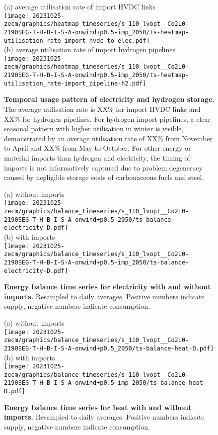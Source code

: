 \begin{figure*}
    \centering
    \footnotesize
    (a) average utilisation rate of import HVDC links \\
    \texttt{[image: 20231025-zecm/graphics/heatmap\_timeseries/s\_110\_lvopt\_\_Co2L0-2190SEG-T-H-B-I-S-A-onwind+p0.5-imp\_2050/ts-heatmap-utilisation\_rate-import\_hvdc-to-elec.pdf]} \\
    (b) average utilisation rate of import hydrogen pipelines \\
    \texttt{[image: 20231025-zecm/graphics/heatmap\_timeseries/s\_110\_lvopt\_\_Co2L0-2190SEG-T-H-B-I-S-A-onwind+p0.5-imp\_2050/ts-heatmap-utilisation\_rate-import\_pipeline-h2.pdf]}
    \caption{\textbf{Temporal usage pattern of electricity and hydrogen storage.}
    The average utilisation rate is XX\% for import HVDC links and XX\% for
    hydrogen pipelines. For hydrogen import pipelines, a clear seasonal pattern
    with higher utilisation in winter is visible, demonstrated by an average utilisation rate of XX\% from November to April and XX\% from May to October.
    For other energy or material
    imports than hydrogen and electricity, the timing of imports is not
    informatively captured due to problem degeneracy caused by negligible
    storage costs of carbonaceous fuels and steel.}
    \label{fig:si:import-operation}
\end{figure*}

\begin{figure*}
    \centering
    \footnotesize
    (a) without imports \\
    \texttt{[image: 20231025-zecm/graphics/balance\_timeseries/s\_110\_lvopt\_\_Co2L0-2190SEG-T-H-B-I-S-A-onwind+p0.5\_2050/ts-balance-electricity-D.pdf]} \\
    (b) with imports \\
    \texttt{[image: 20231025-zecm/graphics/balance\_timeseries/s\_110\_lvopt\_\_Co2L0-2190SEG-T-H-B-I-S-A-onwind+p0.5-imp\_2050/ts-balance-electricity-D.pdf]}
    \caption{\textbf{Energy balance time series for electricity with and without imports.} Resampled to daily averages. Positive numbers indicate supply, negative numbers indicate consumption.}
    \label{fig:si:balance-elec}
\end{figure*}

\begin{figure*}
    \centering
    \footnotesize
    (a) without imports \\
    \texttt{[image: 20231025-zecm/graphics/balance\_timeseries/s\_110\_lvopt\_\_Co2L0-2190SEG-T-H-B-I-S-A-onwind+p0.5\_2050/ts-balance-heat-D.pdf]} \\
    (b) with imports \\
    \texttt{[image: 20231025-zecm/graphics/balance\_timeseries/s\_110\_lvopt\_\_Co2L0-2190SEG-T-H-B-I-S-A-onwind+p0.5-imp\_2050/ts-balance-heat-D.pdf]}
    \caption{\textbf{Energy balance time series for heat with and without imports.} Resampled to daily averages. Positive numbers indicate supply, negative numbers indicate consumption.}
    \label{fig:si:balance-heat}
\end{figure*}


